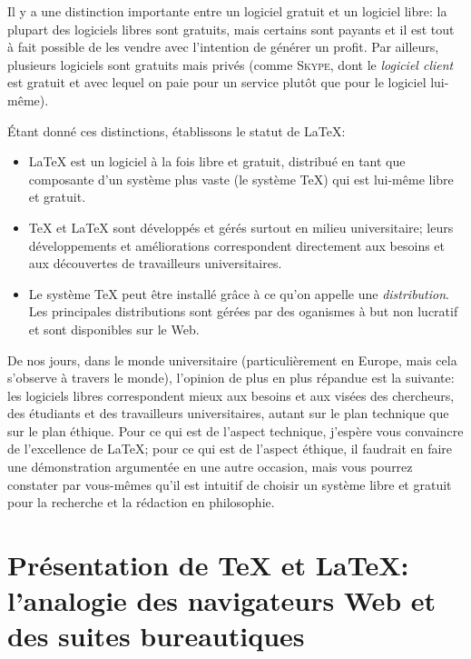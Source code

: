 \documentclass{article}
\newcommand\entite[1]{{\textsc{#1}}}
\newenvironment{defex}
{\begin{tcolorbox}[
    colback=yellow!5!white,
    colframe=red!25!black,
    coltext=red!25!black,
    arc=0mm,
    outer arc=0mm,
    toprule=0mm,
    bottomrule=0mm,
]}
{\end{tcolorbox}}
\begin{document}
Il y a une distinction importante entre un logiciel gratuit et un logiciel libre: la plupart des logiciels libres sont gratuits, mais certains sont payants et il est tout à fait possible de les vendre avec l’intention de générer un profit. Par ailleurs, plusieurs logiciels sont gratuits mais privés (comme \entite{Skype}, dont le \emph{logiciel client} est gratuit et avec lequel on paie pour un service plutôt que pour le logiciel lui-même).

Étant donné ces distinctions, établissons le statut de \LaTeX{}:

\begin{defex}
\begin{itemize}
\item \LaTeX{} est un logiciel à la fois libre et gratuit, distribué en tant que composante d’un système plus vaste (le système \TeX{}) qui est lui-même libre et gratuit.

\item \TeX{} et \LaTeX{} sont développés et gérés surtout en milieu universitaire; leurs développements et améliorations correspondent directement aux besoins et aux découvertes de travailleurs universitaires.

\item Le système \TeX{} peut être installé grâce à ce qu’on appelle une \emph{distribution}. Les principales distributions sont gérées par des oganismes à but non lucratif et sont disponibles sur le Web.
\end{itemize}
\end{defex}

De nos jours, dans le monde universitaire (particulièrement en Europe, mais cela s’observe à travers le monde), l’opinion de plus en plus répandue est la suivante: les logiciels libres correspondent mieux aux besoins et aux visées des chercheurs, des étudiants et des travailleurs universitaires, autant sur le plan technique que sur le plan éthique. Pour ce qui est de l’aspect technique, j’espère vous convaincre de l’excellence de \LaTeX{}; pour ce qui est de l’aspect éthique, il faudrait en faire une démonstration argumentée en une autre occasion, mais vous pourrez constater par vous-mêmes qu’il est intuitif de choisir un système libre et gratuit pour la recherche et la rédaction en philosophie.

\section{Présentation de \TeX{} et \LaTeX{}: l’analogie des navigateurs Web et des suites bureautiques}
\end{document}
